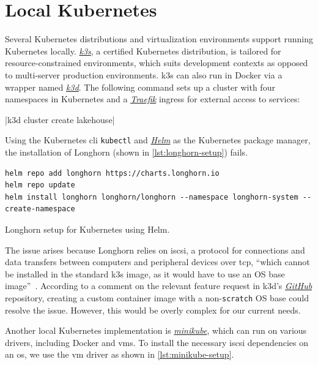 \section{Local Kubernetes}
\label{sec:appendix-kubernetes}

Several Kubernetes distributions and virtualization environments support running Kubernetes locally.
\href{https://k3s.io/}{\textit{k3s}}, a certified Kubernetes distribution, is tailored for resource-constrained environments, which suits development contexts as opposed to multi-server production environments.
k3s can also run in Docker via a wrapper named \href{https://k3d.io/}{\textit{k3d}}.
The following command sets up a cluster with four namespaces in Kubernetes and a \href{https://traefik.io/traefik/}{\textit{Traefik}} ingress for external access to services:

|k3d cluster create lakehouse|

Using the Kubernetes \ac{cli} \texttt{kubectl} and \href{https://helm.sh/}{\textit{Helm}} as the Kubernetes package manager, the installation of Longhorn (shown in \cref{lst:longhorn-setup}) fails.

\begin{listing}[H]
\begin{verbatim}
helm repo add longhorn https://charts.longhorn.io
helm repo update
helm install longhorn longhorn/longhorn --namespace longhorn-system --create-namespace
\end{verbatim}
\caption{Longhorn setup for Kubernetes using Helm.}
\label{lst:longhorn-setup}
\end{listing}

The issue arises because Longhorn relies on \ac{iscsi}, a protocol for connections and data transfers between computers and peripheral devices over \ac{tcp}, ``which cannot be installed in the standard k3s image, as it would have to use an OS base image''~\cite{Rizzi2021}.
According to a comment on the relevant feature request in k3d's \href{https://github.com/}{\textit{GitHub}} repository, creating a custom container image with a non-\texttt{scratch} OS base could resolve the issue.
However, this would be overly complex for our current needs.

Another local Kubernetes implementation is \href{https://minikube.sigs.k8s.io}{\textit{minikube}}, which can run on various drivers, including Docker and \acp{vm}.
To install the necessary \ac{iscsi} dependencies on an \ac{os}, we use the \ac{vm} driver as shown in \cref{lst:minikube-setup}.

